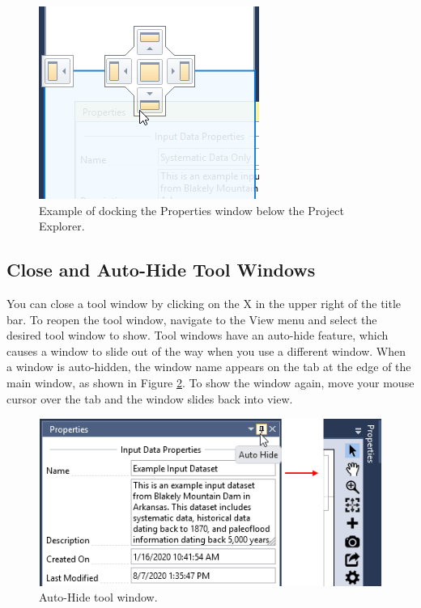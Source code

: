 \documentclass[
]{book}
\begin{document}
\begin{figure}

{\centering \includegraphics{images/figure22} 

}

\caption{Example of docking the Properties window below the Project Explorer.}\label{fig:figure-22}
\end{figure}

\hypertarget{close-and-auto-hide-tool-windows}{%
\subsection{Close and Auto-Hide Tool Windows}\label{close-and-auto-hide-tool-windows}}

You can close a tool window by clicking on the X in the upper right of the title bar. To reopen the tool window, navigate to the View menu and select the desired tool window to show. Tool windows have an auto-hide feature, which causes a window to slide out of the way when you use a different window. When a window is auto-hidden, the window name appears on the tab at the edge of the main window, as shown in Figure \ref{fig:figure-23}. To show the window again, move your mouse cursor over the tab and the window slides back into view.

\begin{figure}

{\centering \includegraphics{images/figure23} 

}

\caption{Auto-Hide tool window.}\label{fig:figure-23}
\end{figure}
\end{document}
